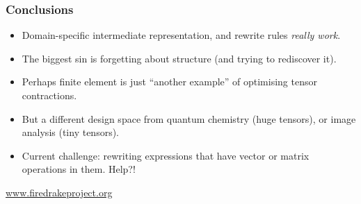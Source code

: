 \documentclass[presentation]{beamer}
\begin{document}
\begin{frame}
  \frametitle{Conclusions}
  \begin{itemize}
  \item Domain-specific intermediate representation, and
    rewrite rules \emph{really work}.
  \item The biggest sin is forgetting about structure (and trying to
    rediscover it).
  \item Perhaps finite element is just ``another example'' of
    optimising tensor contractions.
  \item But a different design space from quantum chemistry (huge
    tensors), or image analysis (tiny tensors).
  \item Current challenge: rewriting expressions that have vector or
    matrix operations in them.  Help?!
  \end{itemize}
  \begin{center}
    {\small \url{www.firedrakeproject.org}}
  \end{center}
\end{frame}
\end{document}
